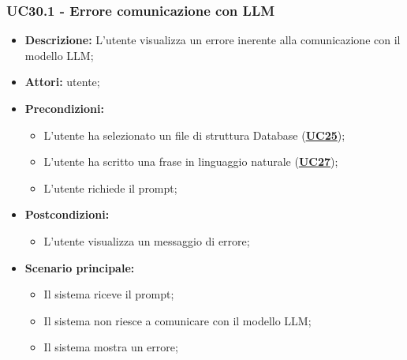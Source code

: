\subsubsection{UC30.1 - Errore comunicazione con LLM}
\label{sec:UC30.1}
\begin{itemize}
	\item \textbf{Descrizione:} L’utente visualizza un errore inerente alla comunicazione con il modello LLM;
	\item \textbf{Attori:} utente;
	\item \textbf{Precondizioni:} 
	\begin{itemize}
		\item L’utente ha selezionato un file di struttura Database (\hyperref[sec:UC25]{\textbf{UC25}});
		\item L’utente ha scritto una frase in linguaggio naturale (\hyperref[sec:UC27]{\textbf{UC27}});
		\item L’utente richiede il prompt;
	\end{itemize}
	\item \textbf{Postcondizioni:} 
	\begin{itemize}
		\item L’utente visualizza un messaggio di errore;
	\end{itemize}
	\item \textbf{Scenario principale:} 
	\begin{itemize}
		\item Il sistema riceve il prompt;
		\item Il sistema non riesce a comunicare con il modello LLM;
		\item Il sistema mostra un errore;
	\end{itemize}
\end{itemize}

